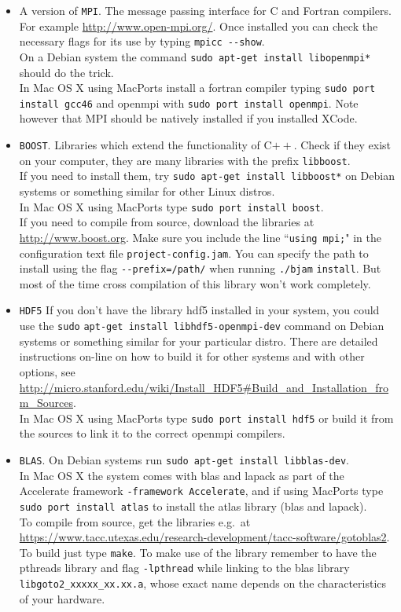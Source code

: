 \begin{itemize}
\item A version of \verb!MPI!.
The message passing interface for C and Fortran compilers. For example \url{http://www.open-mpi.org/}.
Once installed you can check the necessary flags for its use by typing
\verb!mpicc --show!.\\
On a Debian system the command \verb!sudo apt-get install libopenmpi*! should do the trick.\\
In Mac OS X using MacPorts install a fortran compiler typing
\verb!sudo port install gcc46! and openmpi with \verb!sudo port install openmpi!. Note however that MPI should be natively installed if you installed XCode.

\item \verb!BOOST!.
Libraries which extend the functionality of C$++$. Check if they exist on your computer, they are many
libraries with the prefix \verb!libboost!.\\
If you need to install them, try \verb!sudo apt-get install libboost*! on Debian systems or
something similar for other Linux distros.\\
In Mac OS X using MacPorts type \verb!sudo port install boost!.\\
If you need to compile from source, download the libraries at \url{http://www.boost.org}.
Make sure you include the line ``\verb!using mpi;!" in the configuration text file \verb!project-config.jam!.
You can specify the path to install using the flag \verb!--prefix=/path/! when running \verb!./bjam!
\verb!install!. But most of the time cross compilation of this library won't work completely.

\item \verb!HDF5!
If you don't have the library hdf5 installed in your system, you could use the
\verb!sudo! \verb!apt-get install libhdf5-openmpi-dev! command on Debian systems or something similar
for your particular distro. There are detailed instructions on-line on how to build it for other systems and
with other options, see \url{http://micro.stanford.edu/wiki/Install_HDF5#Build_and_Installation_from_Sources}.\\
In Mac OS X using MacPorts type \verb!sudo port install hdf5! or build it from the sources to link it to the correct
openmpi compilers.

\item \verb!BLAS!.
On Debian systems run \verb!sudo apt-get install libblas-dev!.\\
In Mac OS X
the system comes with blas and lapack as part of the Accelerate framework \verb!-framework Accelerate!,
and if using MacPorts type
\verb!sudo port install atlas! to install the atlas library (blas and lapack).\\
To compile from source, get the libraries e.g.\ at \url{https://www.tacc.utexas.edu/research-development/tacc-software/gotoblas2}. To build just type \verb!make!.
To make use of the library remember to
have the pthreads library and flag  \verb!-lpthread! while linking to the blas library  \verb!libgoto2_xxxxx_xx.xx.a!,
whose exact name depends on the characteristics of your hardware.


\end{itemize}
